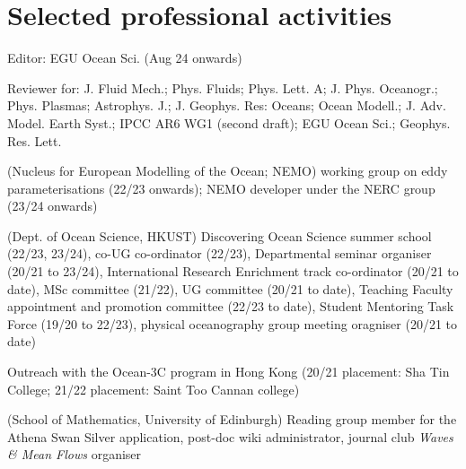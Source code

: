 \documentclass[letterpaper]{article}
\renewenvironment{itemize}{
  \begin{list}{}{
    \setlength{\leftmargin}{1.5em}
  }
}{
  \end{list}
}
\begin{document}
\section*{Selected professional activities}
\begin{itemize}

\item[--] Editor: EGU Ocean Sci. (Aug 24 onwards)

\item[--] Reviewer for: J. Fluid Mech.; Phys. Fluids; Phys. Lett. A; J. Phys.
Oceanogr.; Phys. Plasmas; Astrophys. J.; J. Geophys. Res: Oceans; Ocean Modell.;
J. Adv. Model. Earth Syst.; IPCC AR6 WG1 (second draft); EGU Ocean Sci.; Geophys. Res. Lett.

\item[--] (Nucleus for European Modelling of the Ocean; NEMO) working group on
eddy parameterisations (22/23 onwards); NEMO developer under the NERC group
(23/24 onwards)

\item[--] (Dept. of Ocean Science, HKUST) Discovering Ocean Science summer
school (22/23, 23/24), co-UG co-ordinator (22/23), Departmental seminar
organiser (20/21 to 23/24), International Research Enrichment track co-ordinator
(20/21 to date), MSc committee (21/22), UG committee (20/21 to date), Teaching
Faculty appointment and promotion committee (22/23 to date), Student Mentoring
Task Force (19/20 to 22/23), physical oceanography group meeting oragniser
(20/21 to date)

\item[--] Outreach with the Ocean-3C program in Hong Kong (20/21 placement: Sha
Tin College; 21/22 placement: Saint Too Cannan college)

\item[--] (School of Mathematics, University of Edinburgh) Reading group member
for the Athena Swan Silver application, post-doc wiki administrator, journal
club \textit{Waves \& Mean Flows} organiser 

\end{itemize}


\end{document}
